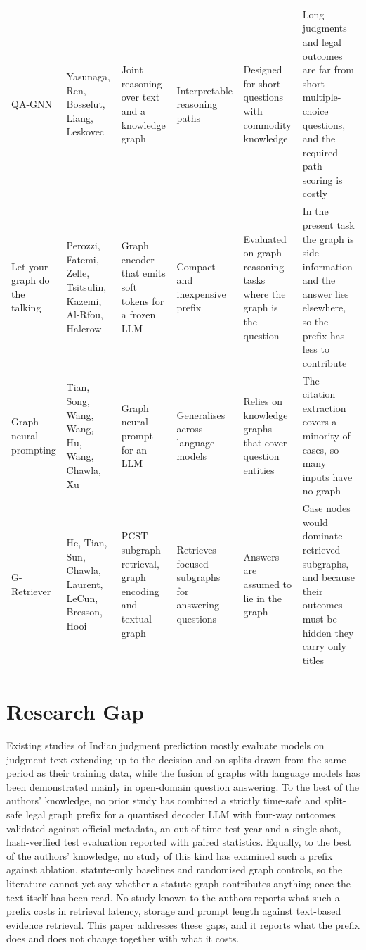 \documentclass[journal]{IEEEtran}
\begin{document}
\begin{table}[!t]
\begin{tabular}{@{}Y{0.145\textwidth}Y{0.095\textwidth}Y{0.165\textwidth}Y{0.155\textwidth}Y{0.155\textwidth}Y{0.21\textwidth}@{}}
QA-GNN \cite{r19} & Yasunaga, Ren, Bosselut, Liang, Leskovec & Joint reasoning over text and a knowledge graph & Interpretable reasoning paths & Designed for short questions with commodity knowledge & Long judgments and legal outcomes are far from short multiple-choice questions, and the required path scoring is costly\\
Let your graph do the talking \cite{r21} & Perozzi, Fatemi, Zelle, Tsitsulin, Kazemi, Al-Rfou, Halcrow & Graph encoder that emits soft tokens for a frozen LLM & Compact and inexpensive prefix & Evaluated on graph reasoning tasks where the graph is the question & In the present task the graph is side information and the answer lies elsewhere, so the prefix has less to contribute\\
Graph neural prompting \cite{r22} & Tian, Song, Wang, Wang, Hu, Wang, Chawla, Xu & Graph neural prompt for an LLM & Generalises across language models & Relies on knowledge graphs that cover question entities & The citation extraction covers a minority of cases, so many inputs have no graph\\
G-Retriever \cite{r23} & He, Tian, Sun, Chawla, Laurent, LeCun, Bresson, Hooi & PCST subgraph retrieval, graph encoding and textual graph & Retrieves focused subgraphs for answering questions & Answers are assumed to lie in the graph & Case nodes would dominate retrieved subgraphs, and because their outcomes must be hidden they carry only titles\\
\bottomrule
\end{tabular}
\end{table}


\section{Research Gap}\label{sec:gap}
Existing studies of Indian judgment prediction mostly evaluate models on judgment text extending up to the decision and on splits drawn from the same period as their training data, while the fusion of graphs with language models has been demonstrated mainly in open-domain question answering. To the best of the authors' knowledge, no prior study has combined a strictly time-safe and split-safe legal graph prefix for a quantised decoder LLM with four-way outcomes validated against official metadata, an out-of-time test year and a single-shot, hash-verified test evaluation reported with paired statistics. Equally, to the best of the authors' knowledge, no study of this kind has examined such a prefix against ablation, statute-only baselines and randomised graph controls, so the literature cannot yet say whether a statute graph contributes anything once the text itself has been read. No study known to the authors reports what such a prefix costs in retrieval latency, storage and prompt length against text-based evidence retrieval. This paper addresses these gaps, and it reports what the prefix does and does not change together with what it costs.
\end{document}
